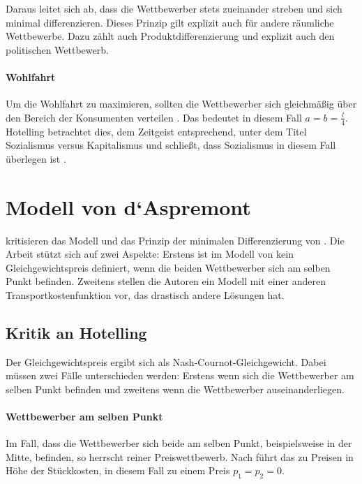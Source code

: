 Daraus leitet sich ab, dass die Wettbewerber stets zueinander streben und sich minimal differenzieren.
Dieses Prinzip gilt explizit auch für andere räumliche Wettbewerbe.
Dazu zählt \citet{hotelling1929} auch Produktdifferenzierung und explizit auch den politischen Wettbewerb. \citep[S.\,54-5]{hotelling1929}

\paragraph{Wohlfahrt}
Um die Wohlfahrt zu maximieren, sollten die Wettbewerber sich gleichmäßig über den Bereich der Konsumenten verteilen \citep[S.\,53]{hotelling1929}.
Das bedeutet in diesem Fall $a=b=\frac{l}{4}$. Hotelling betrachtet dies, dem Zeitgeist entsprechend, unter dem Titel Sozialismus versus Kapitalismus und schließt, dass Sozialismus in diesem Fall überlegen ist \citep[S.\,52]{hotelling1929}.

\section{Modell von d‘Aspremont}\label{Sec-Aspremont}

\citet{aspremont1979} kritisieren das Modell und das Prinzip der minimalen Differenzierung von \citet{hotelling1929}.
Die Arbeit stützt sich auf zwei Aspekte: Erstens ist im Modell von \citet{hotelling1929} kein Gleichgewichtspreis definiert, wenn die beiden Wettbewerber sich am selben Punkt befinden.
Zweitens stellen die Autoren ein Modell mit einer anderen Transportkostenfunktion vor, das drastisch andere Lösungen hat. \citep[S.\,1145]{aspremont1979}

\subsection{Kritik an Hotelling}
Der Gleichgewichtspreis ergibt sich als Nash-Cournot-Gleichgewicht.
Dabei müssen zwei Fälle unterschieden werden: Erstens wenn sich die Wettbewerber am selben Punkt befinden und zweitens wenn die Wettbewerber auseinanderliegen.

\paragraph{Wettbewerber am selben Punkt}
Im Fall, dass die Wettbewerber sich beide am selben Punkt, beispielsweise in der Mitte, befinden, so herrscht reiner Preiswettbewerb.
Nach \citet{bertrand1883theorie} führt das zu Preisen in Höhe der Stückkosten, in diesem Fall zu einem Preis $p_1=p_2=0$. \citep[S.\,1146-7]{aspremont1979}


